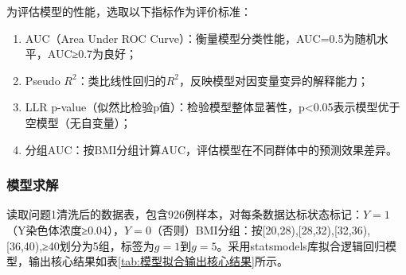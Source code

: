 \documentclass[withoutpreface,bwprint]{cumcmthesis} %
\begin{document}
为评估模型的性能，选取以下指标作为评价标准：
\begin{enumerate}
    \item AUC（Area Under ROC Curve）：衡量模型分类性能，AUC=0.5为随机水平，AUC≥0.7为良好；
    \item Pseudo $R^2$：类比线性回归的$R^2$，反映模型对因变量变异的解释能力；
    \item LLR p-value（似然比检验p值）：检验模型整体显著性，p<0.05表示模型优于空模型（无自变量）；
    \item 分组AUC：按BMI分组计算AUC，评估模型在不同群体中的预测效果差异。
\end{enumerate}
  

\subsubsection{模型求解}  
读取问题1清洗后的数据表，包含926例样本，对每条数据达标状态标记：$Y=1$（Y染色体浓度≥0.04），$Y=0$（否则）BMI分组：按[20,28),[28,32),[32,36),[36,40),≥40划分为5组，标签为$g=1$到$g=5$。采用statsmodels库拟合逻辑回归模型，输出核心结果如表\ref{tab:模型拟合输出核心结果}所示。
\end{document}
